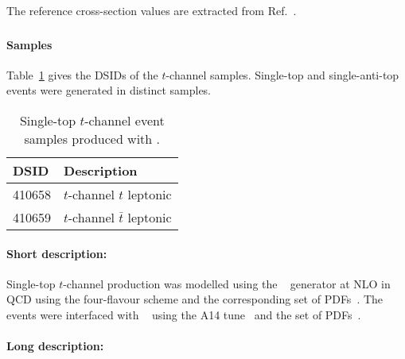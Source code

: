The reference cross-section values are extracted from Ref.~\cite{LHCTopWGsgtopXsec}.


\subsubsection[Powheg+Pythia8]{\POWPY[8]}
\label{subsubsec:tchan_PP8}

\paragraph{Samples}

Table~\ref{tab:tchan_PP8} gives the DSIDs of the $t$-channel \POWPY[8] samples.
Single-top and single-anti-top events were generated in distinct samples.

\begin{table}[!htbp]
  \caption{Single-top $t$-channel event samples produced with \POWPY[8].}%
  \label{tab:tchan_PP8}
  \centering
  \begin{tabular}{l l}
    \toprule
    DSID & Description \\
    \midrule
    410658 & $t$-channel $t$ leptonic \\
    410659 & $t$-channel $\bar{t}$ leptonic \\
    \bottomrule
  \end{tabular}
\end{table}

\paragraph{Short description:}

Single-top $t$-channel production was modelled using the
\POWHEGBOX[v2]~\cite{Frederix:2012dh,Nason:2004rx,Frixione:2007vw,Alioli:2010xd}
generator at NLO in QCD using the four-flavour scheme and the
corresponding \NNPDF[3.0nlo] set of PDFs~\cite{Ball:2014uwa}.  The events were
interfaced with \PYTHIA[8.230]~\cite{Sjostrand:2014zea} using the A14
tune~\cite{ATL-PHYS-PUB-2014-021} and the \NNPDF[2.3lo] set of
PDFs~\cite{Ball:2012cx}.




\paragraph{Long description:}

